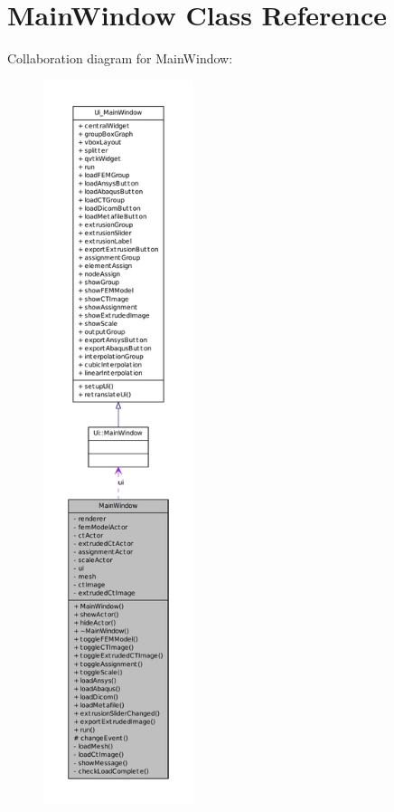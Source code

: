 \hypertarget{class_main_window}{
\section{MainWindow Class Reference}
\label{class_main_window}
}


Collaboration diagram for MainWindow:
\nopagebreak
\begin{figure}[H]
\begin{center}
\leavevmode
\includegraphics[height=600pt]{class_main_window__coll__graph}
\end{center}
\end{figure}
